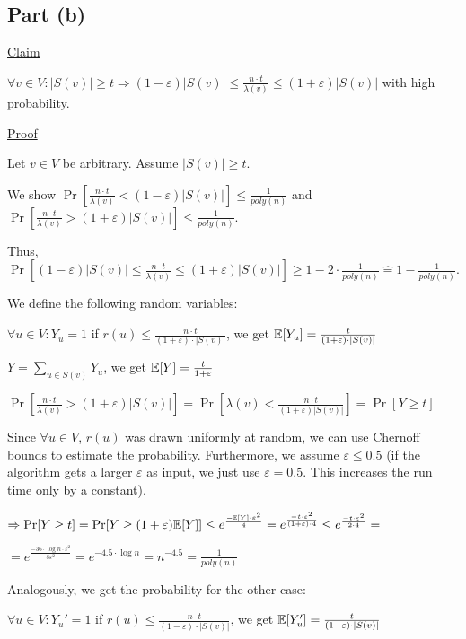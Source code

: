 \subsection*{Part (b)}

\underline{Claim}

$\forall v \in V:  |S(v)| \geq t \Rightarrow (1 - \varepsilon) |S(v)| \leq \frac{n\cdot t}{\lambda(v)} \leq (1 + \varepsilon)|S(v)|$ with high probability.

\underline{Proof}

Let $v \in V$ be arbitrary. Assume $|S(v)| \geq t$.

We show $\Pr\left[\frac{n\cdot t}{\lambda(v)} < (1 - \varepsilon) |S(v)|\right] \leq \frac{1}{poly(n)}$ and $\Pr\left[\frac{n\cdot t}{\lambda(v)} > (1 + \varepsilon) |S(v)| \right] \leq \frac{1}{poly(n)}$. 

Thus, $\Pr\left[ (1 - \varepsilon) |S(v)| \leq \frac{n\cdot t}{\lambda(v)} \leq (1 + \varepsilon)|S(v)| \right] \geq 1 - 2\cdot\frac{1}{poly(n)} \mathrel{\widehat{=}} 1 - \frac{1}{poly(n)}$.


We define the following random variables:

$\forall u \in V: Y_u = 1$ if $r(u) \leq \frac{n\cdot t}{(1 + \varepsilon)\cdot|S(v)|}$, we get $\mathbb{E}[Y_u] = \frac{t}{(1 + \varepsilon)\cdot|S(v)|}$


$Y = \sum\limits_{u \in S(v)} Y_u$, we get $\mathbb{E}[Y] = \frac{t}{1 + \varepsilon}$


$
\Pr\left[\frac{n\cdot t}{\lambda(v)} > (1 + \varepsilon) |S(v)|\right] = 
\Pr\left[\lambda(v) < \frac{n\cdot t}{(1 + \varepsilon) |S(v)|}\right] =
\Pr[Y \geq t]
$

Since $\forall u \in V$, $r(u)$ was drawn uniformly at random, we can use Chernoff bounds to estimate the probability. Furthermore, we assume $\varepsilon \leq 0.5$ (if the algorithm gets a larger $\varepsilon$ as input, we just use $\varepsilon = 0.5$. This increases the run time only by a constant). 

$\Rightarrow \Pr[Y \geq t] = 
\Pr[Y \geq (1 + \varepsilon)\mathbb{E}[Y]] \leq 
e^{\frac{-\mathbb{E}[Y]\cdot\varepsilon^2}{4}} =
e^{\frac{-t\cdot\varepsilon^2}{(1 + \varepsilon)\cdot 4}} \leq
e^{\frac{-t\cdot\varepsilon^2}{2 \cdot 4}} = 
$

$ =
e^{\frac{-36\cdot \log n \cdot\varepsilon^2}{8\varepsilon^2}} = 
e^{-4.5\cdot \log n} = 
n^{-4.5} = 
\frac{1}{poly(n)}$

Analogously, we get the probability for the other case:

$\forall u \in V: Y_u' = 1$ if $r(u) \leq \frac{n\cdot t}{(1 - \varepsilon)\cdot|S(v)|}$, we get $\mathbb{E}[Y_u'] = \frac{t}{(1 - \varepsilon)\cdot|S(v)|}$


